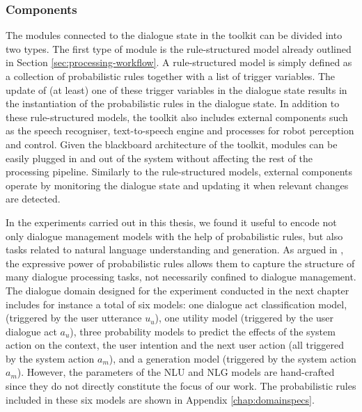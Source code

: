 \subsubsection*{Components}

The modules connected to the dialogue state in the \opendial{} toolkit can be divided into two types. The first type of module is the rule-structured model already outlined in Section \ref{sec:processing-workflow}.  A rule-structured model is simply defined as a collection of probabilistic rules together with a list of trigger variables.  The update of (at least) one of these trigger variables in the dialogue state results in the instantiation of the probabilistic rules in the dialogue state. In addition to these rule-structured models, the \opendial{} toolkit also includes external components such as the speech recogniser, text-to-speech engine and processes for robot perception and control. Given the blackboard architecture of the toolkit, modules can be easily plugged in and out of the system without affecting the rest of the processing pipeline. Similarly to the rule-structured models, external components operate by monitoring the dialogue state and updating it when relevant changes are detected. 

In the experiments carried out in this thesis, we found it useful to encode not only dialogue management models with the help of probabilistic rules, but also tasks related to natural language understanding and generation. As argued in \cite{lison-semdial2012}, the expressive power of probabilistic rules allows them to capture the structure of many dialogue processing tasks, not necessarily confined to dialogue management. The dialogue domain designed for the experiment conducted in the next chapter includes for instance a total of six models: one dialogue act classification model, (triggered by the user utterance $u_u$), one utility model (triggered by the user dialogue act $a_u$), three probability models to predict the effects of the system action on the context, the user intention and the next user action (all triggered by the system action $a_m$), and a generation model (triggered by the system action $a_m$).  However, the parameters of the NLU and NLG models are hand-crafted since they do not directly constitute the focus of our work. The probabilistic rules included in these six models are shown in Appendix \ref{chap:domainspecs}.

